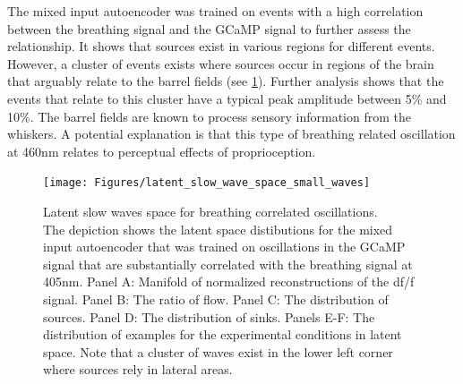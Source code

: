 The mixed input autoencoder was trained on events with a high correlation between the breathing signal and the GCaMP signal to further assess the relationship. It shows that sources exist in various regions for different events. However, a cluster of events exists where sources occur in regions of the brain that arguably relate to the barrel fields (see \ref{fig:latent_slow_wave_space_small_waves}). Further analysis shows that the events that relate to this cluster have a typical peak amplitude between 5\% and 10\%. The barrel fields are known to process sensory information from the whiskers. A potential explanation is that this type of breathing related oscillation at 460nm relates to perceptual effects of proprioception.
\begin{figure}[!htb]
\centering
\texttt{[image: Figures/latent\_slow\_wave\_space\_small\_waves]}
\decoRule
\caption[Latent slow waves space for breathing correlated oscillations]{Latent slow waves space for breathing correlated oscillations.\\The depiction shows the latent space distibutions for the mixed input autoencoder that was trained on oscillations in the GCaMP signal that are substantially correlated with the breathing signal at 405nm. Panel A: Manifold of normalized reconstructions of the df/f signal. Panel B: The ratio of flow. Panel C: The distribution of sources. Panel D: The distribution of sinks. Panels E-F: The distribution of examples for the experimental conditions in latent space. Note that a cluster of waves exist in the lower left corner where sources rely in lateral areas.}
\label{fig:latent_slow_wave_space_small_waves}
\end{figure}
